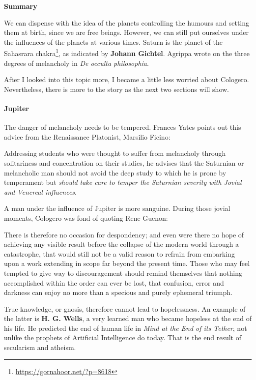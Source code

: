 \textbf{Summary}


We can dispense with the idea of the planets controlling the humours and setting them at birth, since we are free beings. However, we can still put ourselves under the influences of the planets at various times. Saturn is the planet of the Sahasrara chakra\footnote{\url{https://gornahoor.net/?p=8618}}, as indicated by \textbf{Johann Gichtel}. Agrippa wrote on the three degrees of melancholy in \emph{De occulta philosophia}.

After I looked into this topic more, I became a little less worried about Cologero. Nevertheless, there is more to the story as the next two sections will show.

\paragraph{Jupiter}


The danger of melancholy needs to be tempered. Frances Yates points out this advice from the Renaissance Platonist, Marsilio Ficino:

\begin{quotex}
Addressing students who were thought to suffer from melancholy through solitariness and concentration on their studies, he advises that the Saturnian or melancholic man should not avoid the deep study to which he is prone by temperament but \emph{should take care to temper the Saturnian severity with Jovial and Venereal influences}.
\end{quotex}


A man under the influence of Jupiter is more sanguine. During those jovial moments, Cologero was fond of quoting Rene Guenon:

\begin{quotex}
There is therefore no occasion for despondency; and even were there no hope of achieving any visible result before the collapse of the modern world through a catastrophe, that would still not be a valid reason to refrain from embarking upon a work extending in scope far beyond the present time. Those who may feel tempted to give way to discouragement should remind themselves that nothing accomplished within the order can ever be lost, that confusion, error and darkness can enjoy no more than a specious and purely ephemeral triumph.
\end{quotex}


True knowledge, or gnosis, therefore cannot lead to hopelessness. An example of the latter is \textbf{H. G. Wells}, a very learned man who became hopeless at the end of his life. He predicted the end of human life in \emph{Mind at the End of its Tether}, not unlike the prophets of Artificial Intelligence do today. That is the end result of secularism and atheism.

